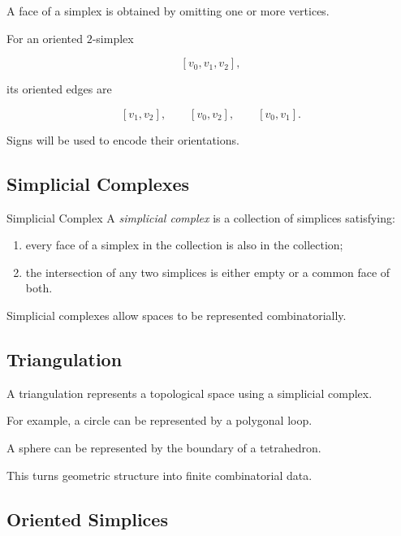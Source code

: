 A face of a simplex is obtained by omitting one or more vertices.

For an oriented \(2\)-simplex

\[
[v_0,v_1,v_2],
\]

its oriented edges are

\[
[v_1,v_2],
\qquad
[v_0,v_2],
\qquad
[v_0,v_1].
\]

Signs will be used to encode their orientations.

\subsection{Simplicial Complexes}
\label{subsec:simplicial-complexes}

\begin{definitionbox}{Simplicial Complex}
A \emph{simplicial complex} is a collection of simplices satisfying:

\begin{enumerate}
    \item every face of a simplex in the collection is also in the
    collection;

    \item the intersection of any two simplices is either empty or a common
    face of both.
\end{enumerate}
\end{definitionbox}

Simplicial complexes allow spaces to be represented combinatorially.

\subsection{Triangulation}
\label{subsec:topological-triangulation}

A triangulation represents a topological space using a simplicial complex.

For example, a circle can be represented by a polygonal loop.

A sphere can be represented by the boundary of a tetrahedron.

This turns geometric structure into finite combinatorial data.

\subsection{Oriented Simplices}
\label{subsec:oriented-simplices}

